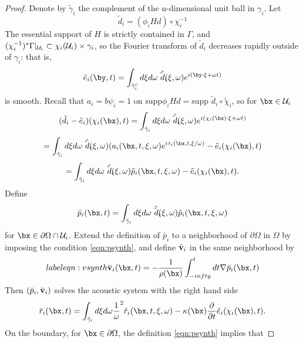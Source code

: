 \begin{proof}
Denote by $\tilde{\gamma}_i$ the complement of the n-dimensional unit
ball in $\gamma_i$. Let
\[
  \tilde{d}_i = (\phi_iHd) \circ \chi_i^{-1}
\]
The essential support of $H$ is strictly contained in
$\Gamma$, and $(\chi_i^{-1})^*\Gamma|_{{\cal U}_i} \subset
\chi_i({\cal U}_i) \times \gamma_i$, so the Fourier transform of
$\tilde{d}_i$ decreases rapidly outside of $\gamma_i$: that is,
\begin{equation}
  \label{eqn:smpart}
  \tilde{e}_i(\by,t) = \int_{\tilde{\gamma}_i^c} d\xi d\omega
  \hat{\tilde{d}_i}(\xi,\omega)e^{i(\by \cdot {\bf \xi} + \omega t)}
\end{equation}
is smooth. Recall that $a_i=b\psi_i=1$ on $\mbox{supp
}\phi_i Hd = \mbox{supp }\tilde{d}_i\circ \tilde{\chi}_i$, so for $\bx \in {\cal U}_i$
\[
(\tilde{d_i}- \tilde{e}_i) (\chi_i(\bx),t)  = \int_{\tilde{\gamma}_i} d\xi d\omega
\hat{\tilde{d}_i}(\xi,\omega)e^{i(\chi_i(\bx) \cdot {\bf \xi} + \omega  t)}
\]
\[
  = \int_{\tilde{\gamma}_i} d\xi d\omega
\hat{\tilde{d}_i}(\xi,\omega)(a_i(\bx,t,{\bf
  \xi},\omega)e^{i\tau_i(\bx,t,{\bf \xi}/\omega)} - \tilde{e}_i(\chi_i(\bx),t)
\]
\begin{equation}
  \label{eqn:prepsynth}
  = \int_{\tilde{\gamma}_i} d\xi d\omega \hat{\tilde{d}_i}({\bf
    \xi},\omega)\tilde{p}_i(\bx,t,{\bf \xi}, \omega) - \tilde{e}_i(\chi_i(\bx),t).
\end{equation}
Define 
\begin{equation}
  \label{eqn:psynth}
  \bar{p}_i(\bx,t) = \int_{\tilde{\gamma}_i} d\xi d\omega \hat{\tilde{d}_i}({\bf
    \xi},\omega)\tilde{p}_i(\bx,t,{\bf \xi}, \omega)
\end{equation}
for $\bx \in \partial \Omega \cap {\cal U}_i$. Extend the definition
of $\bar{p}_i$ to a neighborhood of $\partial \Omega$ in $\Omega$ by
imposing the condition \ref{eqn:psynth}, and
define $\bar{\bf{v}}_i$ in the same neighborhood by
\begin{equation}
  label{eqn:vsynth}
  \bar{\bf{v}}_i(\bx,t) = -\frac{1}{\rho(\bx)}\int_{-infty}^t dt \nabla \bar{p}_i(\bx,t)
\end{equation}
Then $(\bar{p}_i,{\bar{\bf v}}_i)$ solves the acoustic system with the right hand side
\begin{equation}
\label{eqn:rhs}
\bar{r}_i(\bx,t) = \int_{\tilde{\gamma}_i} d\xi d\omega
\frac{1}{\omega}^2\tilde{r}_i(\bx,t,{\bf \xi},\omega) -
\kappa(\bx)\frac{\partial}{\partial t}\tilde{e}_i(\chi_i(\bx),t) .
\end{equation}
On the boundary, for $\bx \in \partial \Omega$, the definition
\ref{eqn:psynth} implies that

\end{proof}
